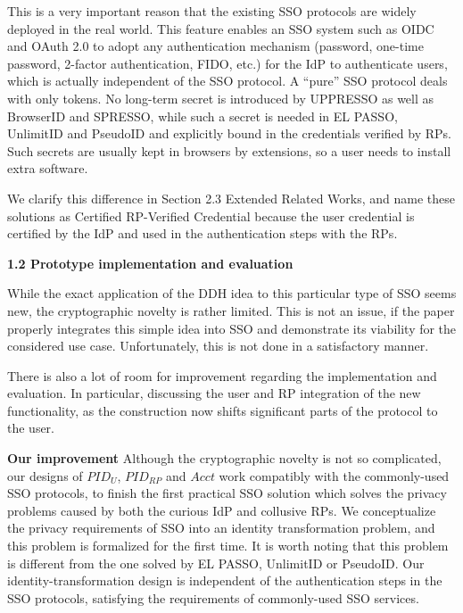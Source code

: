 \documentclass[letterpaper,onecolumn,10pt]{article}
\begin{document}
This is a very important reason that the existing SSO protocols are widely deployed in the real world.
This feature enables an SSO system such as OIDC and OAuth 2.0 to adopt any authentication mechanism
 (password, one-time password, 2-factor authentication, FIDO, etc.) for the IdP to authenticate users, which is actually independent of the SSO protocol.
A ``pure'' SSO protocol deals with only tokens.
No long-term secret is introduced by UPPRESSO as well as BrowserID and SPRESSO,
    while such a secret is needed in EL PASSO, UnlimitID and PseudoID and explicitly bound in the credentials verified by RPs.
Such secrets are usually kept in browsers by extensions,
    so a user needs to install extra software.

We clarify this difference in Section 2.3 Extended Related Works,
    and name these solutions as Certified RP-Verified Credential
        because the user credential is certified by the IdP and used in the authentication steps with the RPs.


\vspace{1mm}\noindent\textbf{1.2 Prototype implementation and evaluation}

While the exact application of the DDH idea to this particular type of SSO seems new, the cryptographic novelty is rather limited.
This is not an issue, if the paper properly integrates this simple idea into SSO and demonstrate its viability for the considered use case.
Unfortunately, this is not done in a satisfactory manner.

There is also a lot of room for improvement regarding the implementation and evaluation.
In particular, discussing the user and RP integration of the new functionality, as the construction now shifts significant parts of the protocol to the user.


\vspace{1mm}\noindent\textbf{Our improvement} Although the cryptographic novelty is not so complicated,
        our designs of $PID_U$, $PID_{RP}$ and $Acct$ work compatibly with the commonly-used SSO protocols,
            to finish the first practical SSO solution which solves the privacy problems caused by both the curious IdP and collusive RPs.
We conceptualize the privacy requirements of SSO into an identity transformation problem,
    and this problem is formalized for the first time.
It is worth noting that
        this problem is different from the one solved by EL PASSO, UnlimitID or PseudoID.
Our identity-transformation design is independent of the authentication steps in the SSO protocols,
            satisfying the requirements of commonly-used SSO services.
\end{document}
